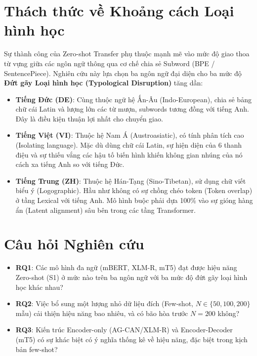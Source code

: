\documentclass[12pt,a4paper,oneside]{report}
\begin{document}
\section{Thách thức về Khoảng cách Loại hình học}

Sự thành công của Zero-shot Transfer phụ thuộc mạnh mẽ vào mức độ giao thoa từ vựng giữa các ngôn ngữ thông qua cơ chế chia sẻ Subword (BPE / SentencePiece). Nghiên cứu này lựa chọn ba ngôn ngữ đại diện cho ba mức độ \textbf{Đứt gãy Loại hình học (Typological Disruption)} tăng dần:

\begin{itemize}
    \item \textbf{Tiếng Đức (DE)}: Cùng thuộc ngữ hệ Ấn-Âu (Indo-European), chia sẻ bảng chữ cái Latin và lượng lớn các từ mượn, subwords tương đồng với tiếng Anh. Đây là điều kiện thuận lợi nhất cho chuyển giao.
    \item \textbf{Tiếng Việt (VI)}: Thuộc hệ Nam Á (Austroasiatic), có tính phân tích cao (Isolating language). Mặc dù dùng chữ cái Latin, sự hiện diện của 6 thanh điệu và sự thiếu vắng các hậu tố biến hình khiến không gian nhúng của nó cách xa tiếng Anh so với tiếng Đức.
    \item \textbf{Tiếng Trung (ZH)}: Thuộc hệ Hán-Tạng (Sino-Tibetan), sử dụng chữ viết biểu ý (Logographic). Hầu như không có sự chồng chéo token (Token overlap) ở tầng Lexical với tiếng Anh. Mô hình buộc phải dựa 100\% vào sự gióng hàng ẩn (Latent alignment) sâu bên trong các tầng Transformer.
\end{itemize}

\section{Câu hỏi Nghiên cứu}

\begin{itemize}
    \item \textbf{RQ1}: Các mô hình đa ngữ (mBERT, XLM-R, mT5) đạt được hiệu năng Zero-shot (S1) ở mức nào trên ba ngôn ngữ với ba mức độ đứt gãy loại hình học khác nhau?
    \item \textbf{RQ2}: Việc bổ sung một lượng nhỏ dữ liệu đích (Few-shot, $N \in \{50, 100, 200\}$ mẫu) cải thiện hiệu năng bao nhiêu, và có bão hòa trước $N = 200$ không?
    \item \textbf{RQ3}: Kiến trúc Encoder-only (AG-CAN/XLM-R) và Encoder-Decoder (mT5) có sự khác biệt có ý nghĩa thống kê về hiệu năng, đặc biệt trong kịch bản few-shot?
\end{itemize}
\end{document}
